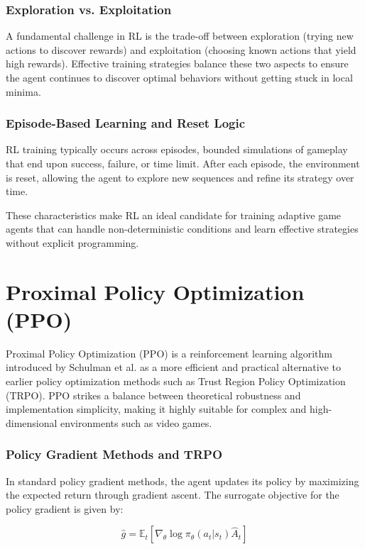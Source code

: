 \documentclass[12pt,oneside,openright,a4paper]{cpe-english-project}
\begin{document}
\subsubsection{Exploration vs. Exploitation}

A fundamental challenge in RL is the trade-off between exploration (trying new actions to discover rewards) and exploitation (choosing known actions that yield high rewards). Effective training strategies balance these two aspects to ensure the agent continues to discover optimal behaviors without getting stuck in local minima.

\subsubsection{Episode-Based Learning and Reset Logic}

RL training typically occurs across episodes, bounded simulations of gameplay that end upon success, failure, or time limit. After each episode, the environment is reset, allowing the agent to explore new sequences and refine its strategy over time.

These characteristics make RL an ideal candidate for training adaptive game agents that can handle non-deterministic conditions and learn effective strategies without explicit programming.

\section{Proximal Policy Optimization (PPO)}

Proximal Policy Optimization (PPO) is a reinforcement learning algorithm introduced by Schulman et al. \cite{schulman2017ppo} as a more efficient and practical alternative to earlier policy optimization methods such as Trust Region Policy Optimization (TRPO). PPO strikes a balance between theoretical robustness and implementation simplicity, making it highly suitable for complex and high-dimensional environments such as video games.

\subsubsection{Policy Gradient Methods and TRPO}

In standard policy gradient methods, the agent updates its policy by maximizing the expected return through gradient ascent. The surrogate objective for the policy gradient is given by:

\begin{equation}
\hat{g} = \mathbb{E}_t \left[ \nabla_{\theta} \log \pi_{\theta}(a_t | s_t) \hat{A}_t \right]
\end{equation}
\end{document}
